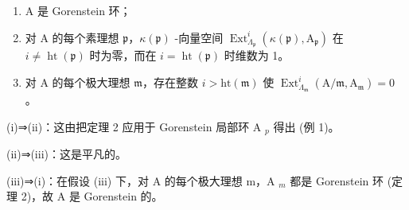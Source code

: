 \begin{enumerate}
\def\labelenumi{(\roman{enumi})}
\item
  A 是 Gorenstein 环；
\item
  对 A 的每个素理想 \(\mathfrak{p}\)，\(\kappa(\mathfrak{p})\) -向量空间 \(\operatorname{Ext}_{\Lambda_{\mathfrak{p}}}^{i}(\kappa(\mathfrak{p}),\mathrm{A}_{\mathfrak{p}})\) 在 \(i \neq \operatorname{ht}(\mathfrak{p})\) 时为零，而在 \(i = \operatorname{ht}(\mathfrak{p})\) 时维数为 1。
\item
  对 A 的每个极大理想 \(\mathfrak{m}\)，存在整数 \(i > \mathrm{ht}(\mathfrak{m})\) 使 \(\operatorname{Ext}_{\Lambda_{\mathfrak{m}}}^{i}(\mathrm{A}/\mathfrak{m},\mathrm{A}_{\mathfrak{m}}) = 0\) 。
\end{enumerate}

(i)⇒(ii)：这由把定理 2 应用于 Gorenstein 局部环 A \(_{p}\) 得出 (例 1)。

(ii)⇒(iii)：这是平凡的。

(iii)⇒(i)：在假设 (iii) 下，对 A 的每个极大理想 m，A \(_{m}\) 都是 Gorenstein 环 (定理 2)，故 A 是 Gorenstein 的。

